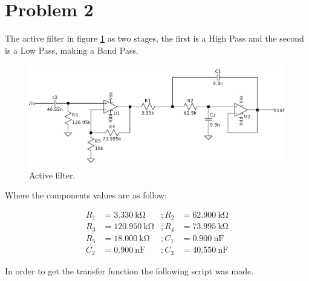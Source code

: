 \section{Problem 2}

The active filter in figure \ref{fig:P2Circ} as two stages, the first is a High Pass and the second is a Low Pass, making a Band Pass.


\begin{figure}[H]
    \centering
    \includegraphics*[scale = 0.25]{Images/P2Circ.png}
    \caption{Active filter.}
    \label{fig:P2Circ}
\end{figure}

Where the components values are as follow:

\begin{equation}
    \begin{aligned}
        R_1 &= \SI{3.330}{\kilo\ohm}   &;R_2 &= \SI{62.900}{\kilo\ohm}\\
        R_3 &= \SI{120.950}{\kilo\ohm} &;R_4 &= \SI{73.995}{\kilo\ohm}\\
        R_5 &= \SI{18.000}{\kilo\ohm}  &;C_1 &= \SI{0.900}{\nano\farad}\\
        C_2 &= \SI{0.900}{\nano\farad} &;C_3 &= \SI{40.550}{\nano\farad}    
    \end{aligned}
\end{equation}

In order to get the transfer function the following script was made.


